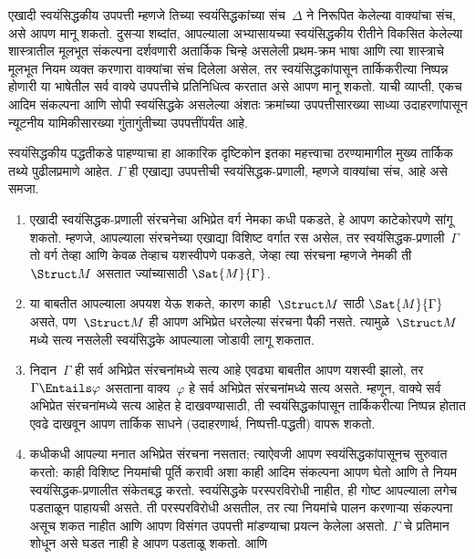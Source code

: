 \begin{explain}
एखादी स्वयंसिद्धकीय उपपत्ती म्हणजे तिच्या स्वयंसिद्धकांच्या संच~$\Delta$
ने निरूपित केलेल्या वाक्यांचा संच, असे आपण मानू शकतो. दुसऱ्या शब्दांत,
आपल्याला अभ्यासायच्या स्वयंसिद्धकीय रीतीने विकसित केलेल्या शास्त्रातील
मूलभूत संकल्पना दर्शवणारी अतार्किक चिन्हे असलेली प्रथम-क्रम भाषा आणि त्या
शास्त्राचे मूलभूत नियम व्यक्त करणारा वाक्यांचा संच दिलेला असेल,
तर स्वयंसिद्धकांपासून तार्किकरीत्या निष्पन्न होणारी या भाषेतील सर्व
वाक्ये उपपत्तीचे प्रतिनिधित्व करतात असे आपण मानू शकतो. याची व्याप्ती,
एकच आदिम संकल्पना आणि सोपी स्वयंसिद्धके असलेल्या अंशतः क्रमांच्या
उपपत्तीसारख्या साध्या उदाहरणांपासून न्यूटनीय यामिकीसारख्या गुंतागुंतीच्या
उपपत्तींपर्यंत आहे.

स्वयंसिद्धकीय पद्धतीकडे पाहण्याचा हा आकारिक दृष्टिकोन इतका महत्त्वाचा
ठरण्यामागील मुख्य तार्किक तथ्ये पुढीलप्रमाणे आहेत. $\Gamma$ ही एखाद्या
उपपत्तीची स्वयंसिद्धक-प्रणाली, म्हणजे वाक्यांचा संच, आहे असे समजा.
\begin{enumerate}
\item एखादी स्वयंसिद्धक-प्रणाली संरचनेचा अभिप्रेत वर्ग नेमका कधी
  पकडते, हे आपण काटेकोरपणे सांगू शकतो. म्हणजे, आपल्याला संरचनेच्या
  एखाद्या विशिष्ट वर्गात रस असेल, तर स्वयंसिद्धक-प्रणाली~$\Gamma$ तो वर्ग
  तेव्हा आणि केवळ तेव्हाच यशस्वीपणे पकडते, जेव्हा त्या संरचना म्हणजे
  नेमकी ती~$\Struct M$ असतात ज्यांच्यासाठी $\Sat{M}{\Gamma}$.
\item या बाबतीत आपल्याला अपयश येऊ शकते, कारण काही~$\Struct M$ साठी
  $\Sat{M}{\Gamma}$ असते, पण~$\Struct M$ ही आपण अभिप्रेत धरलेल्या
  संरचना पैकी नसते. त्यामुळे~$\Struct M$ मध्ये सत्य नसलेली
  स्वयंसिद्धके आपल्याला जोडावी लागू शकतात.
\item निदान~$\Gamma$ ही सर्व अभिप्रेत संरचनांमध्ये सत्य आहे एवढ्या
  बाबतीत आपण यशस्वी झालो, तर $\Gamma \Entails \varphi$ असताना वाक्य~$\varphi$ हे
  सर्व अभिप्रेत संरचनांमध्ये सत्य असते. म्हणून, वाक्ये सर्व
  अभिप्रेत संरचनांमध्ये सत्य आहेत हे दाखवण्यासाठी, ती
  स्वयंसिद्धकांपासून तार्किकरीत्या निष्पन्न होतात एवढे दाखवून आपण तार्किक
  साधने (उदाहरणार्थ, निष्पत्ती-पद्धती) वापरू शकतो.
\item कधीकधी आपल्या मनात अभिप्रेत संरचना नसतात; त्याऐवजी आपण
  स्वयंसिद्धकांपासूनच सुरुवात करतो: काही विशिष्ट नियमांची पूर्ति करावी अशा
  काही आदिम संकल्पना आपण घेतो आणि ते नियम स्वयंसिद्धक-प्रणालीत संकेतबद्ध
  करतो. स्वयंसिद्धके परस्परविरोधी नाहीत, ही गोष्ट आपल्याला लगेच पडताळून
  पाहायची असते. ती परस्परविरोधी असतील, तर त्या नियमांचे पालन करणाऱ्या
  संकल्पना असूच शकत नाहीत आणि आपण विसंगत उपपत्ती मांडण्याचा प्रयत्न केलेला
  असतो. $\Gamma$ चे प्रतिमान शोधून असे घडत नाही हे आपण पडताळू शकतो. आणि

\end{enumerate}
\end{explain}
